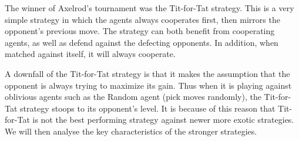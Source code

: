 \documentclass{icldt}
\numberwithin{equation}{section}       %
\begin{document}
The winner of Axelrod's tournament was the Tit-for-Tat strategy. This is a very simple strategy in which the agents always cooperates first, then mirrors the opponent's previous move. The strategy can both benefit from cooperating agents, as well as defend against the defecting opponents. In addition, when matched against itself, it will always cooperate.

A downfall of the Tit-for-Tat strategy is that it makes the assumption that the opponent is always trying to maximize its gain. Thus when it is playing against oblivious agents such as the Random agent (pick moves randomly), the Tit-for-Tat strategy stoops to its opponent's level. It is because of this reason that Tit-for-Tat is not the best performing strategy against newer more exotic strategies. We will then analyse the key characteristics of the stronger strategies. \cite{axelrod1987}
\clearpage
\end{document}
